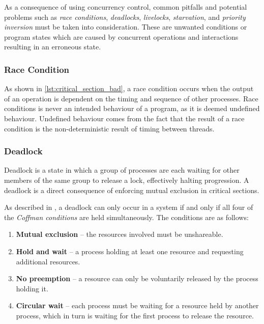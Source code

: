 As a consequence of using concurrency control, common pitfalls and potential problems such as \textit{race conditions}, \textit{deadlocks}, \textit{livelocks}, \textit{starvation}, and \textit{priority inversion} must be taken into consideration. These are unwanted conditions or program states which are caused by concurrent operations and interactions resulting in an erroneous state.


\subsubsection{Race Condition}


As shown in \cref{lst:critical_section_bad}, a race condition occurs when the output of an operation is dependent on the timing and sequence of other processes. Race conditions is never an intended behaviour of a program, as it is deemed undefined behaviour. Undefined behaviour comes from the fact that the result of a race condition is the non\hyp{}deterministic result of timing between threads. 


\subsubsection{Deadlock}


Deadlock is a state in which a group of processes are each waiting for other members of the same group to release a lock, effectively halting progression. A deadlock is a direct consequence of enforcing mutual exclusion in critical sections. 

As described in \citet[pp. 239]{silberschatz2006operating}, a deadlock can only occur in a system if and only if all four of the \textit{Coffman conditions} \citep[pp. 70]{coffman1971system} are held simultaneously. The conditions are as follows:

\begin{enumerate}[topsep=0em,itemsep=-1em,partopsep=0.5em,parsep=1em]
    \item \textbf{Mutual exclusion} -- the resources involved must be unshareable.
    \item \textbf{Hold and wait} -- a process holding at least one resource and requesting additional resources.
    \item \textbf{No preemption} -- a resource can only be voluntarily released by the process holding it.
    \item \textbf{Circular wait} -- each process must be waiting for a resource held by another process, which in turn is waiting for the first process to release the resource.
\end{enumerate}

